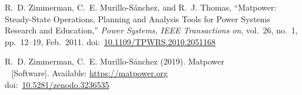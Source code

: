 \documentclass[12pt,a4paper]{book}
\newcommand{\matpower}[0]{{\sc Matpower}}
\newcommand{\doi}[1]{doi:~\href{https://doi.org/#1}{#1}}
\begin{document}
	
	\tableofcontents                            
	\listoffigures
	\listoftables	
	
	
	
	
	
	
	\clearpage
	\begin{thebibliography}{99}
	R.~D. Zimmerman, C.~E. Murillo-S{\'a}nchez, and R.~J. Thomas, ``\matpower{}: Steady-State Operations, Planning and Analysis Tools for Power Systems Research and Education,'' \emph{Power Systems, IEEE Transactions on}, vol.~26, no.~1, pp.~12--19, Feb.~2011.
	\doi{10.1109/TPWRS.2010.2051168}
	
	R.~D. Zimmerman, C.~E. Murillo-S{\'a}nchez (2019). \matpower{}\\~
	[Software]. Available: \url{https://matpower.org}\\
	\doi{10.5281/zenodo.3236535}	
    \end{thebibliography}
	
\end{document}

